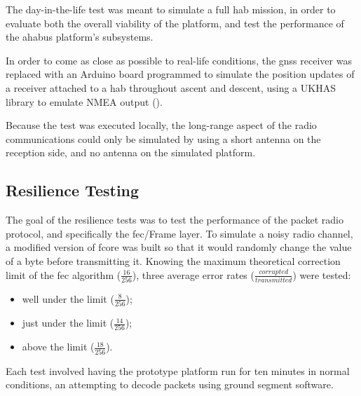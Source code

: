 The day-in-the-life test was meant to simulate a full \acrshort{hab} mission,
in order to evaluate both the overall viability of the platform, and test the
performance of the \acrshort{ahabus} platform's subsystems.

In order to come as close as possible to real-life conditions, the
\acrshort{gnss} receiver was replaced with an Arduino board programmed to
simulate the position updates of a receiver attached to a \acrlong{hab}
throughout ascent and descent, using a UKHAS library to emulate NMEA output
(\cite{UKHAS2010}).

Because the test was executed locally, the long-range aspect of the radio
communications could only be simulated by using a short antenna on the reception
side, and no antenna on the simulated platform.

\subsection{Resilience Testing}
\label{ssec:method-resilience}

The goal of the resilience tests was to test the performance of the packet radio
protocol, and specifically the \acrlong{fec}/Frame layer. To simulate a noisy
radio channel, a modified version of \acrshort{fcore} was built so that it
would randomly change the value of a byte before transmitting it. Knowing the
maximum theoretical correction limit of the \acrshort{fec} algorithm
($\frac{16}{256}$), three average error rates
($\frac{corrupted}{transmitted}$) were tested:

\begin{itemize}
    \item well under the limit ($\frac{8}{256}$);
    \item just under the limit ($\frac{14}{256}$);
    \item above the limit ($\frac{18}{256}$).
\end{itemize}

Each test involved having the prototype platform run for ten minutes in normal
conditions, an attempting to decode packets using ground segment software.
